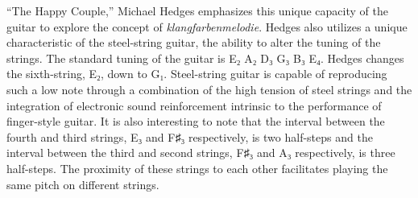 \documentclass{tufte-handout}
\begin{document}
``The Happy Couple,'' Michael Hedges emphasizes this unique capacity of the
guitar to explore the concept of \emph{klangfarbenmelodie}. Hedges also
utilizes a unique characteristic of the steel-string guitar, the ability to
alter the tuning of the strings. The standard tuning of the guitar is E₂ A₂ D₃
G₃ B₃ E₄. Hedges changes the sixth-string, E₂, down to G₁. Steel-string guitar
is capable of reproducing such a low note through a combination of the high
tension of steel strings and the integration of electronic sound reinforcement
intrinsic to the performance of finger-style guitar. It is also interesting to
note that the interval between the fourth and third strings, E₃ and F♯₃
respectively, is two half-steps and the interval between the third and second
strings, F♯₃ and A₃ respectively, is three half-steps. The proximity of these
strings to each other facilitates playing the same pitch on different strings.

\end{document}

